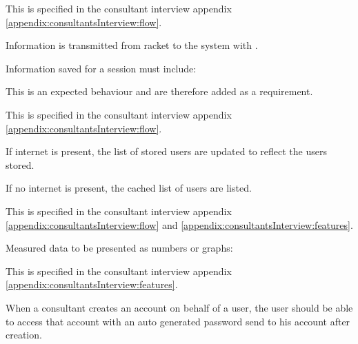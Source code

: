 
This  is specified in the consultant interview appendix \ref{appendix:consultantsInterview:flow}.

Information is transmitted from racket to the system with .

Information saved for a session must include: \newline
{}


This is an expected behaviour and are therefore added as a requirement.


This  is specified in the consultant interview appendix \ref{appendix:consultantsInterview:flow}.

If internet is present, the list of stored users are updated to reflect the users stored.

If no internet is present, the cached list of users are listed.


This  is specified in the consultant interview appendix \ref{appendix:consultantsInterview:flow} and \ref{appendix:consultantsInterview:features}.

Measured data to be presented as numbers or graphs: \newline
{}


This  is specified in the consultant interview appendix \ref{appendix:consultantsInterview:features}.

When a consultant creates an account on behalf of a user, the user should be able to access that account with an auto generated password send to his account after creation.

